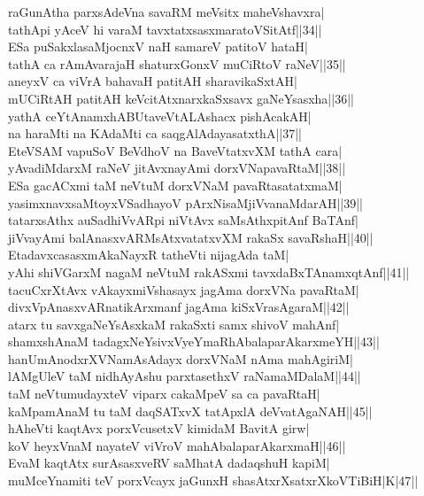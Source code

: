 \documentclass{article}
\begin{document}
raGunAtha parxsAdeVna savaRM meVsitx maheVshavxra|\\
tathApi yAceV hi varaM tavxtatxsasxmaratoVSitAtf||34||\\
ESa puSakxlasaMjocnxV naH samareV patitoV hataH|\\
tathA ca rAmAvarajaH shaturxGonxV muCiRtoV raNeV||35||\\
aneyxV ca viVrA bahavaH patitAH sharavikaSxtAH|\\
mUCiRtAH patitAH keVcitAtxnarxkaSxsavx gaNeYsasxha||36||\\
yathA ceYtAnamxhABUtaveVtALAshacx pishAcakAH|\\
na haraMti na KAdaMti ca saqgAlAdayasatxthA||37||\\
EteVSAM vapuSoV BeVdhoV na BaveVtatxvXM tathA cara|\\
yAvadiMdarxM raNeV jitAvxnayAmi dorxVNapavaRtaM||38||\\
ESa gacACxmi taM neVtuM dorxVNaM pavaRtasatatxmaM|\\
yasimxnavxsaMtoyxVSadhayoV pArxNisaMjiVvanaMdarAH||39||\\
tatarxsAthx auSadhiVvARpi niVtAvx saMsAthxpitAnf BaTAnf|\\
jiVvayAmi balAnasxvARMsAtxvatatxvXM rakaSx savaRshaH||40||\\
EtadavxcasasxmAkaNayxR tatheVti nijagAda taM|\\
yAhi shiVGarxM nagaM neVtuM rakASxmi tavxdaBxTAnamxqtAnf||41||\\
tacuCxrXtAvx vAkayxmiVshasayx jagAma dorxVNa pavaRtaM|\\
divxVpAnasxvARnatikArxmanf jagAma kiSxVrasAgaraM||42||\\
atarx tu savxgaNeYsAsxkaM rakaSxti samx shivoV mahAnf|\\
shamxshAnaM tadagxNeYsivxVyeYmaRhAbalaparAkarxmeYH||43||\\
hanUmAnodxrXVNamAsAdayx dorxVNaM nAma mahAgiriM|\\
lAMgUleV taM nidhAyAshu parxtasethxV raNamaMDalaM||44||\\
taM neVtumudayxteV viparx cakaMpeV sa ca pavaRtaH|\\
kaMpamAnaM tu taM daqSATxvX tatApxlA deVvatAgaNAH||45||\\
hAheVti kaqtAvx porxVcusetxV kimidaM BavitA girw|\\
koV heyxVnaM nayateV viVroV mahAbalaparAkarxmaH||46||\\
EvaM kaqtAtx surAsasxveRV saMhatA dadaqshuH kapiM|\\
muMceYnamiti teV porxVcayx jaGunxH shasAtxrXsatxrXkoVTiBiH|K|47||\\
\end{document}

